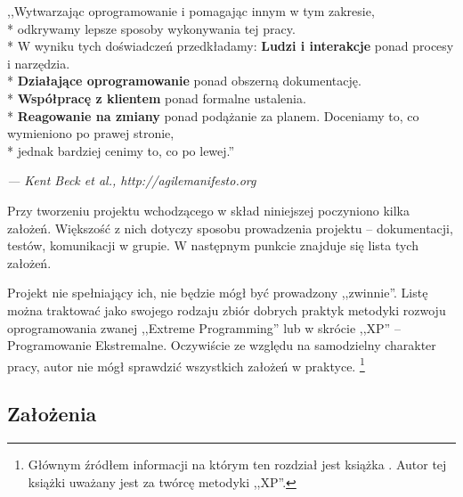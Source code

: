 \begin{center}
    ,,Wytwarzając oprogramowanie i pomagając innym w tym zakresie,\\*
    odkrywamy lepsze sposoby wykonywania tej pracy.\\*
    W wyniku tych doświadczeń przedkładamy:\newline
    \newline
    \textbf{Ludzi i interakcje} ponad procesy i narzędzia.\\*
    \textbf{Działające oprogramowanie} ponad obszerną dokumentację.\\*
    \textbf{Współpracę z klientem} ponad formalne ustalenia.\\*
    \textbf{Reagowanie na zmiany} ponad podążanie za planem.\newline
    \newline
    Doceniamy to, co wymieniono po prawej stronie,\\*
    jednak bardziej cenimy to, co po lewej.''
\end{center}
\hfill \begin{small}\textit{--- Kent Beck et al., http://agilemanifesto.org}\end{small}

Przy tworzeniu projektu wchodzącego w skład niniejszej poczyniono kilka założeń. Większość z nich dotyczy sposobu prowadzenia projektu -- dokumentacji, testów, komunikacji w grupie. W następnym punkcie znajduje się lista tych założeń.

Projekt nie spełniający ich, nie będzie mógł być prowadzony ,,zwinnie''. Listę można traktować jako swojego rodzaju zbiór dobrych praktyk metodyki rozwoju oprogramowania zwanej ,,Extreme Programming'' lub w skrócie ,,XP'' -- Programowanie Ekstremalne. Oczywiście ze względu na samodzielny charakter pracy, autor nie mógł sprawdzić wszystkich założeń w praktyce. \footnote{Głównym źródłem informacji na którym  ten rozdział jest książka \cite{Bec99}. Autor tej książki uważany jest za twórcę metodyki ,,XP''.}

\subsection{Założenia}
\label{sec:ZMTOzalozenia}

